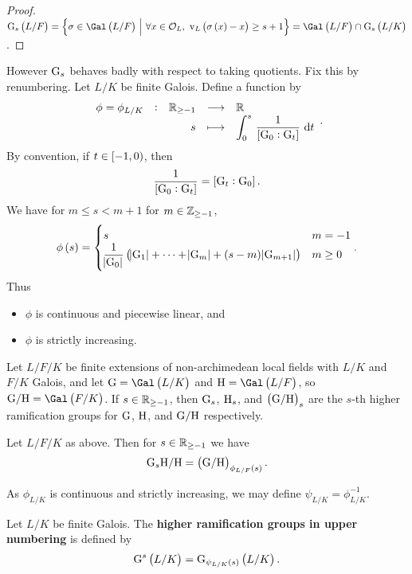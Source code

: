 \begin{proof}
$ \G_s\br{L / F} = \cbr{\sigma \in \Gal\br{L / F} \st \forall x \in \OOO_L, \ \v_L\br{\sigma\br{x} - x} \ge s + 1} = \Gal\br{L / F} \cap \G_s\br{L / K} $.
\end{proof}

However $ \mathrm{G}_s $ behaves badly with respect to taking quotients. Fix this by renumbering. Let $ L / K $ be finite Galois. Define a function by
$$ \function[\phi = \phi_{L / K}]{\RR_{\ge -1}}{\RR}{s}{\intd{0}{s}{\dfrac{1}{\sbr{\G_0 : \G_t}}}{t}}. $$
By convention, if $ t \in \intco{-1, 0} $, then
$$ \dfrac{1}{\sbr{\G_0 : \G_t}} = \sbr{\G_t : \G_0}. $$
We have for $ m \le s < m + 1 $ for $ m \in \mathbb{Z}_{\ge -1} $,
$$ \phi\br{s} =
\begin{cases}
s & m = -1 \\
\dfrac{1}{\abs{\G_0}}\br{\abs{\G_1} + \dots + \abs{\G_m} + \br{s - m}\abs{\G_{m + 1}}} & m \ge 0
\end{cases}.
$$
Thus
\begin{itemize}
\item $ \phi $ is continuous and piecewise linear, and
\item $ \phi $ is strictly increasing.
\end{itemize}

\pagebreak

\begin{notation*}
Let $ L / F / K $ be finite extensions of non-archimedean local fields with $ L / K $ and $ F / K $ Galois, and let $ \G = \Gal\br{L / K} $ and $ \H = \Gal\br{L / F} $, so $ \G / \H = \Gal\br{F / K} $. If $ s \in \mathbb{R}_{\ge -1} $, then $ \mathrm{G}_s $, $ \mathrm{H}_s $, and $ \br{\G / \H}_s $ are the $ s $-th higher ramification groups for $ \mathrm{G} $, $ \mathrm{H} $, and $ \mathrm{G} / \mathrm{H} $ respectively.
\end{notation*}

\begin{theorem}
\label{thm:16.4}
Let $ L / F / K $ as above. Then for $ s \in \mathbb{R}_{\ge -1} $ we have
$$ \G_s\H / \H = \br{\G / \H}_{\phi_{L / F}\br{s}}. $$
\end{theorem}

As $ \phi_{L / K} $ is continuous and strictly increasing, we may define $ \psi_{L / K} = \phi_{L / K}^{-1} $.

\begin{definition}
Let $ L / K $ be finite Galois. The \textbf{higher ramification groups in upper numbering} is defined by
$$ \G^s\br{L / K} = \G_{\psi_{L / K}\br{s}}\br{L / K}. $$
\end{definition}

